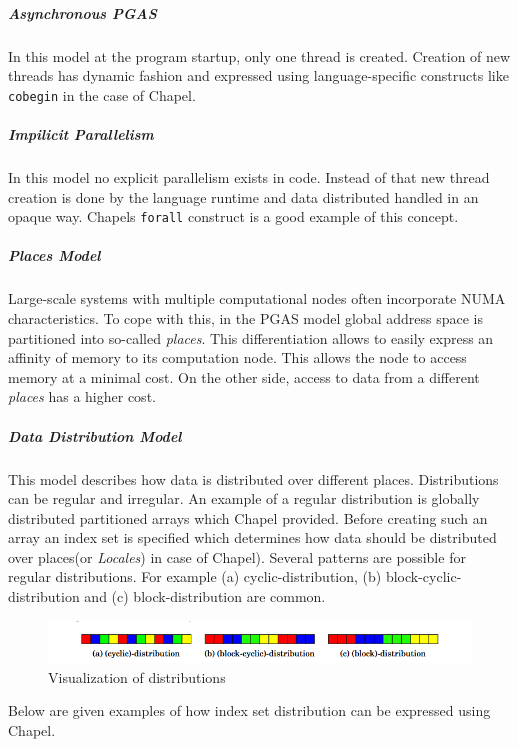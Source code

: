 \documentclass[14pt]{extreport}
\begin{document}
\subparagraph{Asynchronous PGAS}
In this model at the program startup, only one thread is created. Creation of new threads has dynamic fashion and expressed using language-specific constructs like \texttt{cobegin} in the case of Chapel.

\subparagraph{Impilicit Parallelism} In this model no explicit parallelism exists in code. Instead of that new thread creation is done by the language runtime and data distributed handled in an opaque way. Chapels \texttt{forall} construct is a good example of this concept.

\subparagraph{Places Model}
Large-scale systems with multiple computational nodes often incorporate NUMA characteristics. To cope with this, in the PGAS model global address space is partitioned into so-called \textit{places}. This differentiation allows to easily express an affinity of memory to its computation node. This allows the node to access memory at a minimal cost. On the other side, access to data from a different \textit{places} has a higher cost.

\subparagraph{Data Distribution Model}\label{DataDistributionModelSubParagraph}
This model describes how data is distributed over different places. Distributions can be regular and irregular. An example of a regular distribution is globally distributed partitioned arrays which Chapel provided. Before creating such an array an index set is specified which determines how data should be distributed over places(or \textit{Locales}) in case of Chapel). Several patterns are possible for regular distributions. For example (a) cyclic-distribution, (b) block-cyclic-distribution and (c) block-distribution are common.

\begin{figure}[H]
	\centering
	\includegraphics[scale=1]{images/distributions.png}
	\caption{Visualization of distributions}
\end{figure}

Below are given examples of how index set distribution can be expressed using Chapel.
\end{document}

